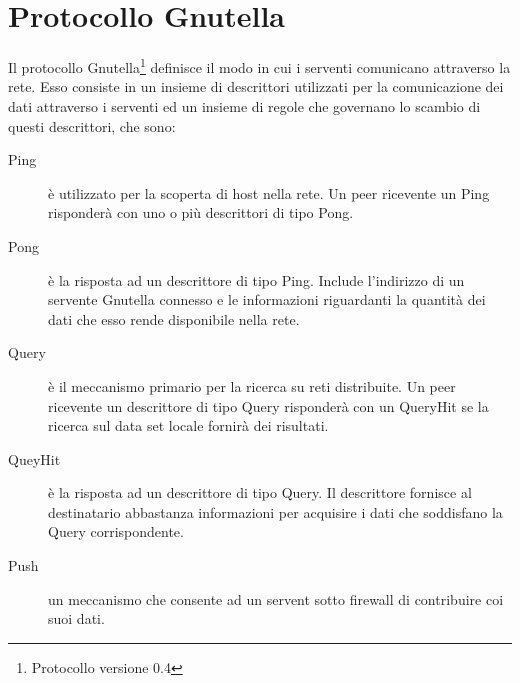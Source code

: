 \section{Protocollo Gnutella}
Il protocollo Gnutella\footnote{Protocollo versione 0.4} definisce il modo in cui i serventi comunicano attraverso la rete. Esso consiste in un insieme di descrittori utilizzati per la comunicazione dei dati attraverso i serventi ed un insieme di regole che governano lo scambio di questi descrittori, che sono:
\begin{description}
\item[Ping] è utilizzato per la scoperta di host nella rete. Un peer ricevente un Ping risponderà con uno o più descrittori di tipo Pong.
\item[Pong] è la risposta ad un descrittore di tipo Ping. Include l’indirizzo di un servente Gnutella connesso e le informazioni riguardanti la quantità dei dati che esso rende disponibile nella rete.
\item[Query] è il meccanismo primario per la ricerca su reti distribuite. Un peer ricevente un descrittore di tipo Query risponderà con un QueryHit se la ricerca sul data set locale fornirà dei risultati.
\item[QueyHit] è la risposta ad un descrittore di tipo Query. Il descrittore fornisce al destinatario abbastanza informazioni per acquisire i dati che soddisfano la Query corrispondente.
\item[Push] un meccanismo che consente ad un servent sotto firewall di contribuire coi suoi dati.
\end{description}
 \begin{figure}
 \centering
 \hspace{5mm}
 \end{figure}
